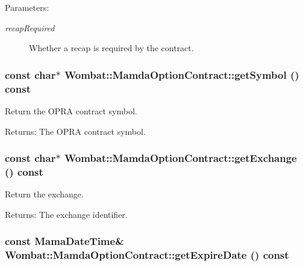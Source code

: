 \begin{Desc}
\item[Parameters:]
\begin{description}
\item[{\em recap\-Required}]Whether a recap is required by the contract. \end{description}
\end{Desc}
\hypertarget{classWombat_1_1MamdaOptionContract_5e8339a42581c6ca70da3c7d1907a57b}{
\subsubsection[getSymbol]{\setlength{\rightskip}{0pt plus 5cm}const char$\ast$ Wombat::Mamda\-Option\-Contract::get\-Symbol () const}}
\label{classWombat_1_1MamdaOptionContract_5e8339a42581c6ca70da3c7d1907a57b}


Return the OPRA contract symbol. 

\begin{Desc}
\item[Returns:]The OPRA contract symbol. \end{Desc}
\hypertarget{classWombat_1_1MamdaOptionContract_776da4aca200db2a474a491f4dae6edb}{
\subsubsection[getExchange]{\setlength{\rightskip}{0pt plus 5cm}const char$\ast$ Wombat::Mamda\-Option\-Contract::get\-Exchange () const}}
\label{classWombat_1_1MamdaOptionContract_776da4aca200db2a474a491f4dae6edb}


Return the exchange. 

\begin{Desc}
\item[Returns:]The exchange identifier. \end{Desc}
\hypertarget{classWombat_1_1MamdaOptionContract_0ff115c7e94c4125a8a4bf11a417f072}{
\subsubsection[getExpireDate]{\setlength{\rightskip}{0pt plus 5cm}const Mama\-Date\-Time\& Wombat::Mamda\-Option\-Contract::get\-Expire\-Date () const}}
\label{classWombat_1_1MamdaOptionContract_0ff115c7e94c4125a8a4bf11a417f072}


